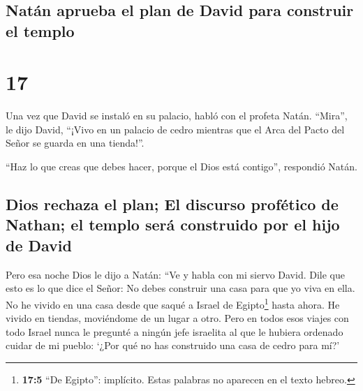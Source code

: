 \hypertarget{natuxe1n-aprueba-el-plan-de-david-para-construir-el-templo}{%
\subsection{Natán aprueba el plan de David para construir el
templo}\label{natuxe1n-aprueba-el-plan-de-david-para-construir-el-templo}}

\hypertarget{section-16}{%
\section{17}\label{section-16}}

 Una vez que David se instaló en su palacio, habló con el
profeta Natán. ``Mira'', le dijo David, ``¡Vivo en un palacio de cedro
mientras que el Arca del Pacto del Señor se guarda en una tienda!''.

 ``Haz lo que creas que debes hacer, porque el Dios está
contigo'', respondió Natán.

\hypertarget{dios-rechaza-el-plan-el-discurso-profuxe9tico-de-nathan-el-templo-seruxe1-construido-por-el-hijo-de-david}{%
\subsection{Dios rechaza el plan; El discurso profético de Nathan; el
templo será construido por el hijo de
David}\label{dios-rechaza-el-plan-el-discurso-profuxe9tico-de-nathan-el-templo-seruxe1-construido-por-el-hijo-de-david}}

 Pero esa noche Dios le dijo a Natán:  ``Ve
y habla con mi siervo David. Dile que esto es lo que dice el Señor: No
debes construir una casa para que yo viva en ella.  No he
vivido en una casa desde que saqué a Israel de Egipto\footnote{\textbf{17:5}
  ``De Egipto'': implícito. Estas palabras no aparecen en el texto
  hebreo.} hasta ahora. He vivido en tiendas, moviéndome de un lugar a
otro.  Pero en todos esos viajes con todo Israel nunca le
pregunté a ningún jefe israelita al que le hubiera ordenado cuidar de mi
pueblo: `¿Por qué no has construido una casa de cedro para mí?'

